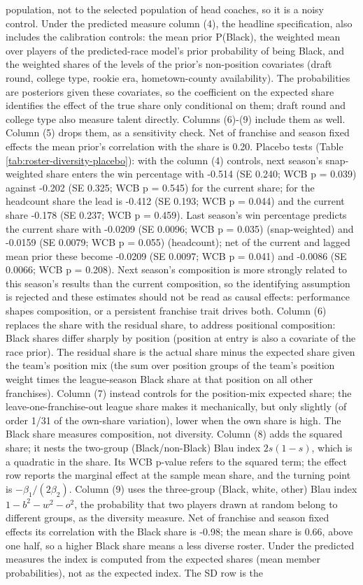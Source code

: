 {population, not to the selected population of head coaches, so it is a noisy control. Under the predicted measure column (4), the headline specification, also includes the calibration controls: the mean prior P(Black), the weighted mean over players of the predicted-race model's prior probability of being Black, and the weighted shares of the levels of the prior's non-position covariates (draft round, college type, rookie era, hometown-county availability). The probabilities are posteriors given these covariates, so the coefficient on the expected share identifies the effect of the true share only conditional on them; draft round and college type also measure talent directly. Columns (6)-(9) include them as well. Column (5) drops them, as a sensitivity check. Net of franchise and season fixed effects the mean prior's correlation with the  share is 0.20. Placebo tests (Table \ref{tab:roster-diversity-placebo}): with the column (4) controls, next season's snap-weighted share enters the win percentage with -0.514 (SE 0.240; WCB p = 0.039) against -0.202 (SE 0.325; WCB p = 0.545) for the current share; for the headcount share the lead is -0.412 (SE 0.193; WCB p = 0.044) and the current share -0.178 (SE 0.237; WCB p = 0.459). Last season's win percentage predicts the current share with -0.0209 (SE 0.0096; WCB p = 0.035) (snap-weighted) and -0.0159 (SE 0.0079; WCB p = 0.055) (headcount); net of the current and lagged mean prior these become -0.0209 (SE 0.0097; WCB p = 0.041) and -0.0086 (SE 0.0066; WCB p = 0.208). Next season's composition is more strongly related to this season's results than the current composition, so the identifying assumption is rejected and these estimates should not be read as causal effects: performance shapes composition, or a persistent franchise trait drives both. Column (6) replaces the share with the residual share, to address positional composition: Black shares differ sharply by position (position at entry is also a covariate of the race prior). The residual share is the actual share minus the expected share given the team's position mix (the sum over position groups of the team's position weight times the league-season Black share at that position on all other franchises). Column (7) instead controls for the position-mix expected share; the leave-one-franchise-out league share makes it mechanically, but only slightly (of order 1/31 of the own-share variation), lower when the own share is high. The Black share measures composition, not diversity. Column (8) adds the squared share; it nests the two-group (Black/non-Black) Blau index $2s(1-s)$, which is a quadratic in the share. Its WCB p-value refers to the squared term; the effect row reports the marginal effect at the sample mean share, and the turning point is $-\beta_1/(2\beta_2)$. Column (9) uses the three-group (Black, white, other) Blau index $1 - b^2 - w^2 - o^2$, the probability that two players drawn at random belong to different groups, as the diversity measure. Net of franchise and season fixed effects its correlation with the Black share is -0.98; the mean share is 0.66, above one half, so a higher Black share means a less diverse roster. Under the predicted measures the index is computed from the expected shares (mean member probabilities), not as the expected index. The SD row is the }
